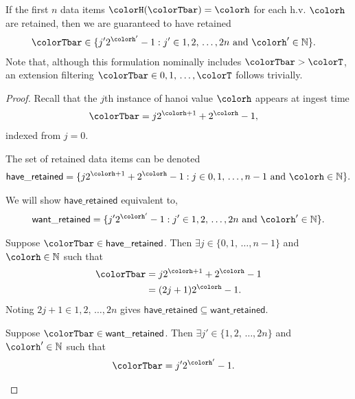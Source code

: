 \begin{lemma}
\label{thm:retained-equivalence-stretched}
If the first $n$ data items $\colorH(\colorTbar) = \colorh$ for each h.v. $\colorh$ are retained, then we are guaranteed to have retained
\begin{align*}
\colorTbar
&\in
\{
  j'2^{\colorh'} - 1
  :
  j' \in 1,2,\,\ldots,2n
  \text{ and }
  \colorh' \in \mathbb{N}
\}.
\end{align*}
Note that, although this formulation nominally includes $\colorTbar > \colorT$, an extension filtering $\colorTbar \in 0,1,\,\ldots,\colorT$ follows trivially.
\end{lemma}
\begin{proof}

Recall that the $j$th instance of hanoi value $\colorh$ appears at ingest time
\begin{align*}
\colorTbar
&= j2^{\colorh + 1} + 2^{\colorh} - 1,
\end{align*}
indexed from $j=0$.

The set of retained data items can be denoted
\begin{align*}
\mathsf{have\_retained} =
\{
  j2^{\colorh + 1} + 2^{\colorh} - 1
  :
  j \in 0,1,\,\ldots,n-1
  \text{ and }
  \colorh \in \mathbb{N}
\}.
\end{align*}

We will show $\mathsf{have\_retained}$ equivalent to,
\begin{align*}
\mathsf{want\_retained} =
\{
  j'2^{\colorh'} - 1
  :
  j' \in 1,2,\,\ldots,2n
  \text{ and }
  \colorh' \in \mathbb{N}
\}.
\end{align*}

\begin{proofpart}
Suppose $\colorTbar \in \mathsf{have\_retained}$.
Then $\exists j \in \{0,1,\,\ldots,n-1\}$ and $\colorh \in \mathbb{N}$ such that
\begin{align*}
\colorTbar
&= j2^{\colorh + 1} + 2^{\colorh} - 1\\
&= (2j + 1)2^{\colorh} - 1.
\end{align*}
Noting $2j + 1 \in 1,2,\,\ldots,2n$ gives $\mathsf{have\_retained} \subseteq \mathsf{want\_retained}$.
\end{proofpart}

\begin{proofpart}
Suppose $\colorTbar \in \mathsf{want\_retained}$.
Then $\exists j'\in\{1,2,\,\ldots,2n\}$ and $\colorh' \in \mathbb{N}$ such that
\begin{align*}
\colorTbar
&= j'2^{\colorh'} - 1.
\end{align*}


\end{proofpart}
\end{proof}
